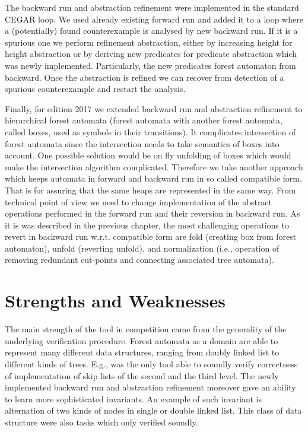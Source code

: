 {The backward run and abstraction refinement were implemented in the standard CEGAR loop.
We used already existing forward run and added it to a loop where a (potentially) found counterexample
is analysed by new backward run. If it is a spurious one we perform refinement abstraction, either
by increasing height for height abstraction or by deriving new predicates for predicate abstraction
which was newly implemented.
Particularly, the new predicates forest automaton from backward.
Once the abstraction is refined we can recover from detection of a spurious counterexample and restart the analysis.

Finally, for edition 2017 we extended backward run and abstraction refinement to hierarchical forest automata
(forest automata with another forest automata, called boxes, used as symbols in their transitions).
It complicates intersection of forest automata since the intersection needs to take semantics of boxes into account.
One possible solution would be on fly unfolding of boxes which would make the intersection algorithm complicated.
Therefore we take another approach which keeps automata in forward and backward run in so called compatible form.
That is for assuring that the same heaps are represented in the same way.
From technical point of view we need to change implementation of the abstract operations performed in the forward run and
their reversion in backward run.
As it is was described in the previous chapter, the most challenging operations to revert in backward run
w.r.t. compatible form are fold (creating box from forest automaton), unfold (reverting unfold),
and normalization (i.e., operation of removing redundant cut-points and connecting associated tree automata).

\section{Strengths and Weaknesses}

The main strength of the tool in competition came from the generality of the underlying
verification procedure.
Forest automata as a domain are able to represent many different data structures,
ranging from doubly linked list to different kinds of trees.
E.g., \forester was the only tool able to soundly verify correctness of implementation of skip lists
of the second and the third level.
The newly implemented backward run and abstraction refinement moreover gave \forester
an ability to learn more sophisticated invariants.
An example of such invariant is alternation of two kinds of nodes in single or double linked list.
This class of data structure were also tasks which only \forester verified soundly.

}
